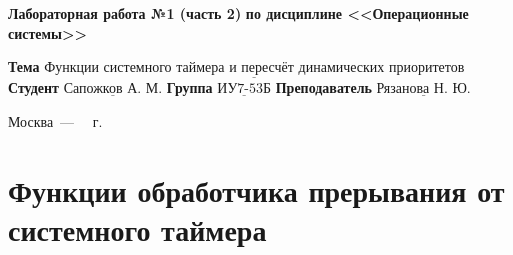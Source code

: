 \documentclass[a4paper,14pt]{extarticle}
\begin{document}
\begin{center}
	\noindent\begin{minipage}{1.3\textwidth}\centering
	\Large\textbf{    Лабораторная работа №1 (часть 2)}\newline
	\textbf{по дисциплине <<Операционные системы>>}\newline\newline\newline
	\end{minipage}
\end{center}

\noindent\textbf{Тема} $\underline{\text{Функции системного таймера и пересчёт динамических приоритетов}}$\newline\newline
\noindent\textbf{Студент} $\underline{\text{Сапожков А. М.}}$\newline\newline
\noindent\textbf{Группа} $\underline{\text{ИУ7-53Б}}$\newline\newline
\noindent\textbf{Преподаватель} $\underline{\text{Рязанова Н. Ю.}}$\newline

\begin{center}
	\vfill
	Москва~---~\the\year
~г.
\end{center}
\clearpage


\section{Функции обработчика прерывания от системного таймера}
\end{document}
